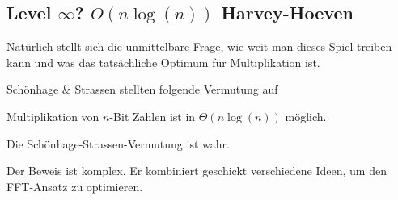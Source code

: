 
\subsection{Level \texorpdfstring{$\infty$}{infinity}? \texorpdfstring{$O(n\log(n))$}{O(n log(n))} Harvey-Hoeven}

\begin{remark}
    Natürlich stellt sich die unmittelbare Frage, wie weit man dieses Spiel treiben kann und was das tatsächliche Optimum für Multiplikation ist.

    Schönhage \& Strassen stellten folgende Vermutung auf
\end{remark}

\begin{conjecture}
    Multiplikation von $n$-Bit Zahlen ist in $\Theta(n\log(n))$ möglich.
\end{conjecture}

\begin{theorem}
    Die Schönhage-Strassen-Vermutung ist wahr.
\end{theorem}

\begin{remark}
    Der Beweis ist komplex. Er kombiniert geschickt verschiedene Ideen, um den FFT-Ansatz zu optimieren.
\end{remark}

